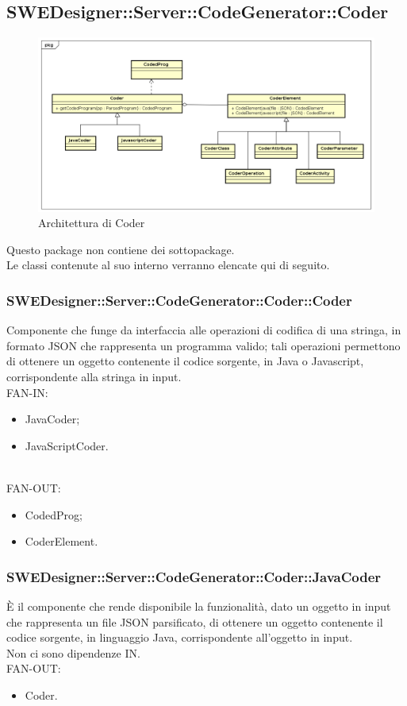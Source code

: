 \documentclass[../PianoDiQualifica.tex]{subfiles}
\begin{document}
		\subsection{SWEDesigner::Server::CodeGenerator::Coder}
			\begin{figure}[H]\label{fig:Coder}
				\centering
				\includegraphics[scale=0.46]{Immagini/DiagrammaArchitettura/Coder.png}
				\caption{Architettura di Coder}
			\end{figure}
		Questo package non contiene dei sottopackage.\\
		Le classi contenute al suo interno verranno elencate qui di seguito.
		\subsubsection{SWEDesigner::Server::CodeGenerator::Coder::Coder}
		Componente che funge da interfaccia alle operazioni di codifica di una stringa, in formato JSON che rappresenta un programma valido; tali operazioni permettono di ottenere un oggetto contenente il codice sorgente, in Java o Javascript, corrispondente alla stringa in input.\\
		FAN-IN:
		\begin{itemize}
			\item JavaCoder;
			\item JavaScriptCoder.
		\end{itemize}\\
		FAN-OUT:
		\begin{itemize}
			\item CodedProg;
			\item CoderElement.
		\end{itemize}
		\subsubsection{SWEDesigner::Server::CodeGenerator::Coder::JavaCoder}
		È il componente che rende disponibile la funzionalità, dato un oggetto in input che rappresenta un file JSON parsificato, di ottenere un oggetto contenente il codice sorgente, in linguaggio Java, corrispondente all'oggetto in input.\\
		Non ci sono dipendenze IN.\\
			FAN-OUT:
			\begin{itemize}
				\item Coder.
			\end{itemize}
\end{document}
